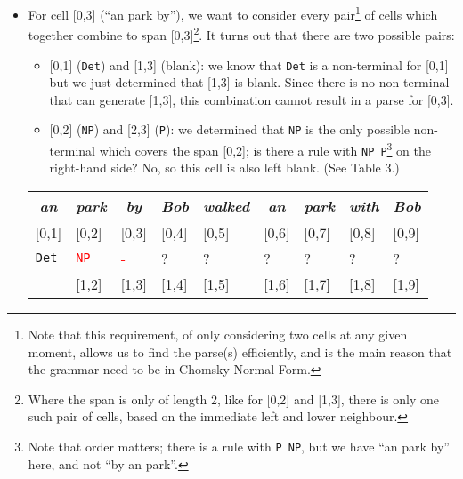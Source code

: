 \documentclass[a4paper]{article}
\begin{document}
\begin{enumerate}
\begin{enumerate}
\begin{enumerate}
\begin{itemize}
\item For cell [0,3] (``an park by''), we want to consider every pair\footnote{Note that this requirement, of only considering two cells at any given moment, allows us to find the parse(s) efficiently, and is the main reason that the grammar need to be in Chomsky Normal Form.} of cells which together combine to span [0,3]\footnote{Where the span is only of length 2, like for [0,2] and [1,3], there is only one such pair of cells, based on the immediate left and lower neighbour.}. It turns out that there are two possible pairs:
\begin{itemize}
\item{} [0,1] (\texttt{Det}) and [1,3] (blank): we know that \texttt{Det} is a non-terminal for [0,1] but we just determined that [1,3] is blank. Since there is no non-terminal that can generate [1,3], this combination cannot result in a parse for [0,3].
\item{} [0,2] (\texttt{NP}) and [2,3] (\texttt{P}): we determined that \texttt{NP} is the only possible non-terminal which covers the span [0,2]; is there a rule with \texttt{NP P}\footnote{Note that order matters; there is a rule with \texttt{P NP}, but we have ``an park by'' here, and not ``by an park''.} on the right-hand side? No, so this cell is also left blank. (See Table 3.)
\end{itemize}
\begin{table}[hp]
\centering
\begin{tabular}{ccccccccc}
\textit{an} & \textit{park} & \textit{by} & \textit{Bob} & \textit{walked} & \textit{an} & \textit{park} & \textit{with} & \textit{Bob}\\
\hline
\multicolumn{1}{|l|}{[0,1]} & \multicolumn{1}{l|}{[0,2]} & \multicolumn{1}{l|}{[0,3]} & \multicolumn{1}{l|}{[0,4]} & \multicolumn{1}{l|}{[0,5]} & \multicolumn{1}{l|}{[0,6]} & \multicolumn{1}{l|}{[0,7]} & \multicolumn{1}{l|}{[0,8]} & \multicolumn{1}{l|}{[0,9]} \\
\multicolumn{1}{|l|}{\texttt{Det}} & \multicolumn{1}{l|}{\textcolor{red}{\texttt{NP}}} & \multicolumn{1}{l|}{\textcolor{red}{-}} & \multicolumn{1}{l|}{?} & \multicolumn{1}{l|}{?} & \multicolumn{1}{l|}{?} & \multicolumn{1}{l|}{?} & \multicolumn{1}{l|}{?} & \multicolumn{1}{l|}{?} \\
\hline
 & \multicolumn{1}{|l|}{[1,2]} & \multicolumn{1}{l|}{[1,3]} & \multicolumn{1}{l|}{[1,4]} & \multicolumn{1}{l|}{[1,5]} & \multicolumn{1}{l|}{[1,6]} & \multicolumn{1}{l|}{[1,7]} & \multicolumn{1}{l|}{[1,8]} & \multicolumn{1}{l|}{[1,9]} \\

\end{tabular}
\end{table}
\end{itemize}
\end{enumerate}
\end{enumerate}
\end{enumerate}
\end{document}
